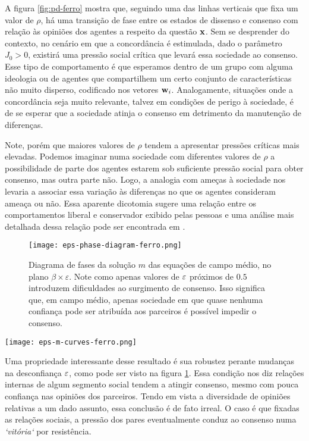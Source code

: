 A figura \ref{fig:pd-ferro} mostra que, seguindo uma das linhas verticais que fixa um valor de $\rho$, há uma transição de fase entre os estados de dissenso e consenso com relação às opiniões dos agentes a respeito da questão $\mathbf{x}$.
Sem se desprender do contexto, no cenário em que a concordância é estimulada, dado o parâmetro $J_0 > 0$, existirá uma pressão social crítica que levará essa sociedade ao consenso.
Esse tipo de comportamento é que esperamos dentro de um grupo com alguma ideologia ou de agentes que compartilhem um certo conjunto de características não muito disperso, codificado nos vetores $\mathbf{w}_{i}$.
Analogamente, situações onde a concordância seja muito relevante, talvez em condições de perigo à sociedade, é de se esperar que a sociedade atinja o consenso em detrimento da manutenção de diferenças.

Note, porém que maiores valores de $\rho$ tendem a apresentar pressões críticas mais elevadas.
Podemos imaginar numa sociedade com diferentes valores de $\rho$ a possibilidade de parte dos agentes estarem sob suficiente pressão social para obter consenso, mas outra parte não.
Logo, a analogia com ameças à sociedade nos levaria a associar essa variação às diferenças no que os agentes consideram ameaça ou não.
Essa aparente dicotomia sugere uma relação entre os comportamentos liberal e conservador exibido pelas pessoas e uma análise mais detalhada dessa relação pode ser encontrada em \parencite{Caticha2011,Vicente2014,Cesar2014}.

\begin{figure}[t!]\label{fig:pd-ferro-eps}
  \centering
  \texttt{[image: eps-phase-diagram-ferro.png]}
  \caption{Diagrama de fases da solução $m$ das equações de campo médio, no plano $\beta \times \varepsilon$.
Note como apenas valores de $\varepsilon$ próximos de $0.5$ introduzem dificuldades ao surgimento de consenso.
Isso significa que, em campo médio, apenas sociedade em que quase nenhuma confiança pode ser atribuída aos parceiros é possível impedir o consenso.}
\end{figure}
\begin{marginfigure}[-9cm]
\texttt{[image: eps-m-curves-ferro.png]}
\caption{Curvas de consenso correspondentes às retas verticais na figura \ref{fig:pd-ferro-eps}.}
\end{marginfigure}

Uma propriedade interessante desse resultado é sua robustez perante mudanças na desconfiança $\varepsilon$, como pode ser visto na figura \ref{fig:pd-ferro-eps}.
Essa condição nos diz relações internas de algum segmento social tendem a atingir consenso, mesmo com pouca confiança nas opiniões dos parceiros.
Tendo em vista a diversidade de opiniões relativas a um dado assunto, essa conclusão é de fato irreal.
O caso é que fixadas as relações sociais, a pressão dos pares eventualmente conduz ao consenso numa \emph{`vitória`} por resistência.

